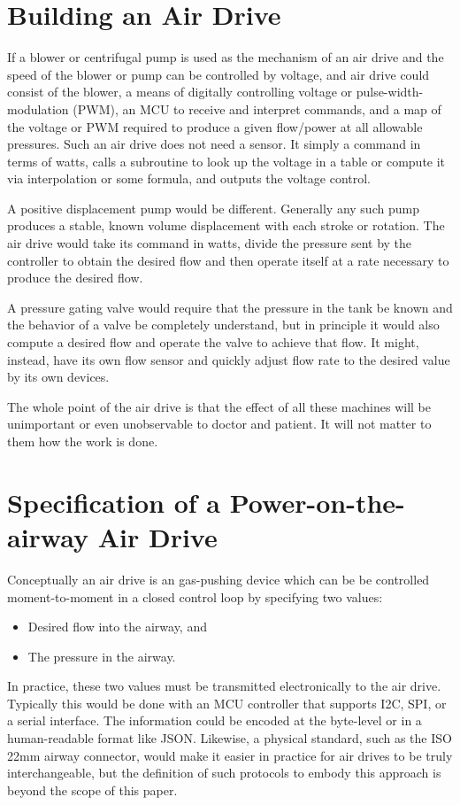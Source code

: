 \documentclass[conference]{article}
\begin{document}
\section{Building an Air Drive}

If a blower or centrifugal pump is used as the mechanism of an air drive and the speed of the
blower or pump can be controlled by voltage, and air drive could consist of the blower,
a means of digitally controlling voltage or pulse-width-modulation (PWM), an MCU to receive and interpret commands, and
a map of the voltage  or PWM required to produce a given flow/power at all allowable pressures.
Such an air drive does not need a sensor.
It simply a command in terms of watts, calls a subroutine to look up the voltage in a table
or compute it via interpolation or some formula, and outputs the voltage control.

A positive displacement pump would be different. Generally any such pump produces a stable, known volume displacement with each
stroke or rotation. The air drive would take its command in watts, divide the pressure sent by the controller to obtain
the desired flow and then operate itself at a rate necessary to produce the desired flow.

A pressure gating valve would require that the pressure in the tank be known and the behavior of a valve
be completely understand, but in principle it would also compute a desired flow and operate the valve to achieve that
flow. It might, instead, have its own flow sensor and quickly adjust flow rate to the desired value by its own devices.

The whole point of the air drive is that the effect of all these machines will be unimportant or even unobservable
to doctor and patient. It will not matter to them how the work is done.

\section{Specification of a Power-on-the-airway Air Drive}

Conceptually an air drive is an gas-pushing device which can be be controlled moment-to-moment in a closed control loop
by specifying two values:
\begin{itemize}
 \item Desired flow into the airway, and
 \item The pressure in the airway.
\end{itemize}

In practice, these two values must be transmitted electronically to the air drive.
Typically this would be done with an MCU controller that supports I2C, SPI,
or a serial interface.
The information could be encoded at the byte-level or
in a human-readable format like JSON.
Likewise, a physical standard, such as the ISO 22mm airway connector,
would make it easier
in practice for air drives to be truly interchangeable, but
the definition of such protocols to embody this approach
is beyond the scope of this paper.
\end{document}
